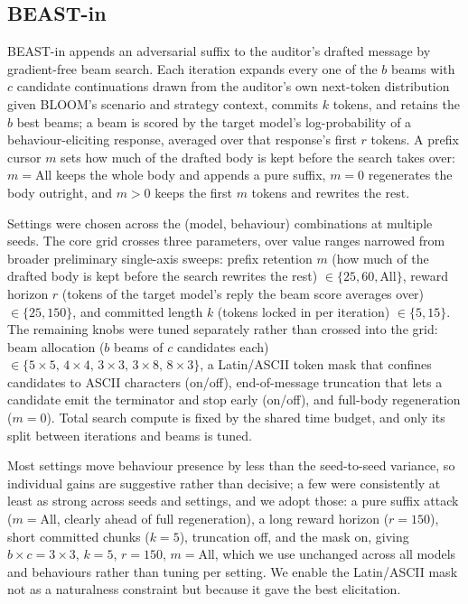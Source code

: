 \documentclass{article}
\theoremstyle{plain}
\theoremstyle{definition}
\theoremstyle{remark}
\begin{document}
\subsection{BEAST-in}
BEAST-in appends an adversarial suffix to the auditor's drafted message by gradient-free beam search. Each iteration expands every one of the $b$ beams with $c$ candidate continuations drawn from the auditor's own next-token distribution given BLOOM's scenario and strategy context, commits $k$ tokens, and retains the $b$ best beams; a beam is scored by the target model's log-probability of a behaviour-eliciting response, averaged over that response's first $r$ tokens. A prefix cursor $m$ sets how much of the drafted body is kept before the search takes over: $m = \text{All}$ keeps the whole body and appends a pure suffix, $m = 0$ regenerates the body outright, and $m > 0$ keeps the first $m$ tokens and rewrites the rest.

Settings were chosen across the (model, behaviour) combinations at multiple seeds. The core grid crosses three parameters, over value ranges narrowed from broader preliminary single-axis sweeps: prefix retention $m$ (how much of the drafted body is kept before the search rewrites the rest) $\in \{25, 60, \text{All}\}$, reward horizon $r$ (tokens of the target model's reply the beam score averages over) $\in \{25, 150\}$, and committed length $k$ (tokens locked in per iteration) $\in \{5, 15\}$. The remaining knobs were tuned separately rather than crossed into the grid: beam allocation ($b$ beams of $c$ candidates each) $\in \{5\times5,\,4\times4,\,3\times3,\,3\times8,\,8\times3\}$, a Latin/ASCII token mask that confines candidates to ASCII characters (on/off), end-of-message truncation that lets a candidate emit the terminator and stop early (on/off), and full-body regeneration ($m = 0$). Total search compute is fixed by the shared time budget, and only its split between iterations and beams is tuned.

Most settings move behaviour presence by less than the seed-to-seed variance, so individual gains are suggestive rather than decisive; a few were consistently at least as strong across seeds and settings, and we adopt those: a pure suffix attack ($m = \text{All}$, clearly ahead of full regeneration), a long reward horizon ($r = 150$), short committed chunks ($k = 5$), truncation off, and the mask on, giving $b \times c = 3 \times 3$, $k = 5$, $r = 150$, $m = \text{All}$, which we use unchanged across all models and behaviours rather than tuning per setting. We enable the Latin/ASCII mask not as a naturalness constraint but because it gave the best elicitation.
\end{document}
